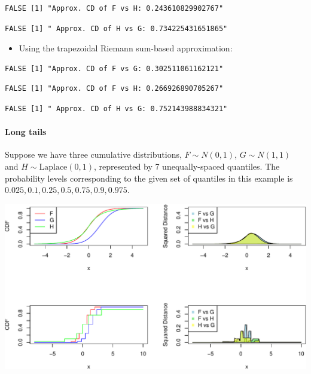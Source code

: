 \documentclass[
]{article}
\providecommand{\tightlist}{%
  \setlength{\itemsep}{0pt}\setlength{\parskip}{0pt}}
\begin{document}
\begin{verbatim}
FALSE [1] "Approx. CD of F vs H: 0.243610829902767"
\end{verbatim}

\begin{verbatim}
FALSE [1] " Approx. CD of H vs G: 0.734225431651865"
\end{verbatim}

\begin{itemize}
\tightlist
\item
  Using the trapezoidal Riemann sum-based approximation:
\end{itemize}

\begin{verbatim}
FALSE [1] "Approx. CD of F vs G: 0.302511061162121"
\end{verbatim}

\begin{verbatim}
FALSE [1] "Approx. CD of F vs H: 0.266926890705267"
\end{verbatim}

\begin{verbatim}
FALSE [1] " Approx. CD of H vs G: 0.752143988834321"
\end{verbatim}

\hypertarget{long-tails}{%
\paragraph{Long tails}\label{long-tails}}

Suppose we have three cumulative distributions, \(F\sim N(0,1)\),
\(G\sim N(1,1)\) and \(H\sim \text{Laplace}(0,1)\), represented by 7
unequally-spaced quantiles. The probability levels corresponding to the
given set of quantiles in this example is
\(0.025,0.1,0.25,0.5,0.75,0.9,0.975\).

\begin{center}\includegraphics{cd_approx_2_files/figure-latex/unnamed-chunk-40-1} \end{center}
\end{document}
